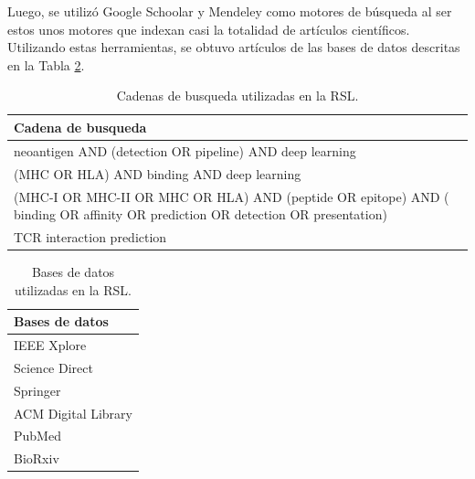 Luego, se utilizó Google Schoolar y Mendeley como motores de búsqueda al ser estos unos motores que indexan casi la totalidad de artículos científicos. Utilizando estas herramientas, se obtuvo artículos de las bases de datos descritas en la Tabla \ref{tab:bd_RSL}.




\begin{table}[H]
	\begin{center}
		\caption{Cadenas de busqueda utilizadas en la RSL.}
		\label{tab:key_words}
		\setlength{\tabcolsep}{0.5em} %
		{\renewcommand{\arraystretch}{1.4}%
				\begin{tabular}{p{14cm}}
				\textbf{Cadena de busqueda} \\ \hline
				neoantigen  AND (detection OR pipeline) AND deep learning                                                                               \\
				(MHC OR HLA) AND binding  AND deep learning                                                                                             \\				
				(MHC-I OR MHC-II OR MHC OR HLA) AND (peptide OR epitope) AND ( binding OR affinity OR prediction OR detection OR presentation)          \\
				TCR interaction prediction                                                                                                              \\		
			\end{tabular}
		}
	\end{center}
\end{table}

\begin{table}[H]
	\begin{center}
		\caption{Bases de datos utilizadas en la RSL.}
		\label{tab:bd_RSL}
		\setlength{\tabcolsep}{0.5em} %
		{\renewcommand{\arraystretch}{1.2}%
			\begin{tabular}{p{14cm}}
				\textbf{Bases de datos} \\ \hline
				IEEE Xplore                                                                               \\
				Science Direct \\				
				Springer          \\
				ACM Digital Library                                                                                                             \\	
				PubMed \\ 
				BioRxiv \\ 	
			\end{tabular}
		}
	\end{center}
\end{table}

